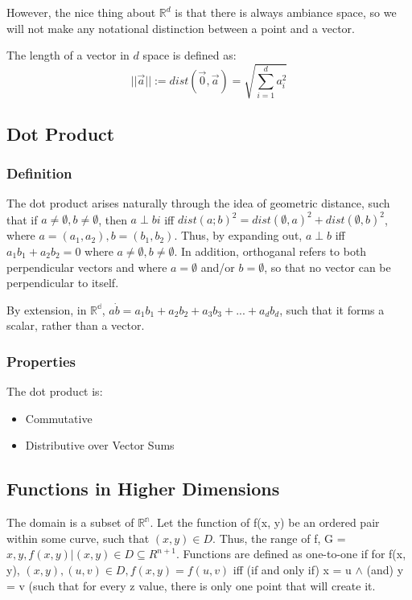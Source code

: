 However, the nice thing about $\mathbb{R}^d$ is that there is always ambiance
space, so we will not make any notational distinction between a point and a
vector.

The length of a vector in $d$ space is defined as:
$$||\vec{a}|| := dist(\vec{0}, \vec{a}) = \sqrt{\sum_{i =
1}^d a_i^2}$$

\subsection{Dot Product}
\subsubsection{Definition}
The dot product arises naturally through the idea of geometric distance, such that if $a \neq \emptyset, b \neq \emptyset$, then $a \perp bi$ iff $dist(a; b)^2 = dist(\emptyset, a)^2 + dist(\emptyset, b)^2$, where $a = (a_1, a_2), b = (b_1, b_2)$. Thus, by expanding out, $a \perp b$ iff $a_1b_1 + a_2b_2 = 0$ where $a \neq \emptyset, b \neq \emptyset$. In addition, orthoganal refers to both perpendicular vectors and where $a = \emptyset$ and/or $b = \emptyset$, so that no vector can be perpendicular to itself.

By extension, in $\mathbb{R^d}$, $a \dot b = a_1b_1 + a_2b_2 + a_3b_3 +...+ a_db_d$, such that it forms a scalar, rather than a vector.

\subsubsection{Properties}
The dot product is:
\begin{itemize}
\item Commutative
\item Distributive over Vector Sums
\end{itemize}

\subsection{Functions in Higher Dimensions}
The domain is a subset of $\mathbb{R^n}$.
Let the function of f(x, y) be an ordered pair within some curve, such that $(x, y) \in D$. Thus, the range of f, G = ${x, y, f(x,y) | (x, y) \in D} \subseteq{R^{n+1}}$.
Functions are defined as one-to-one if for f(x, y), $(x, y), (u, v) \in D, f(x, y) = f(u, v)$ iff (if and only if) x = u $\wedge$ (and) y = v (such that for every z value, there is only one point that will create it.

